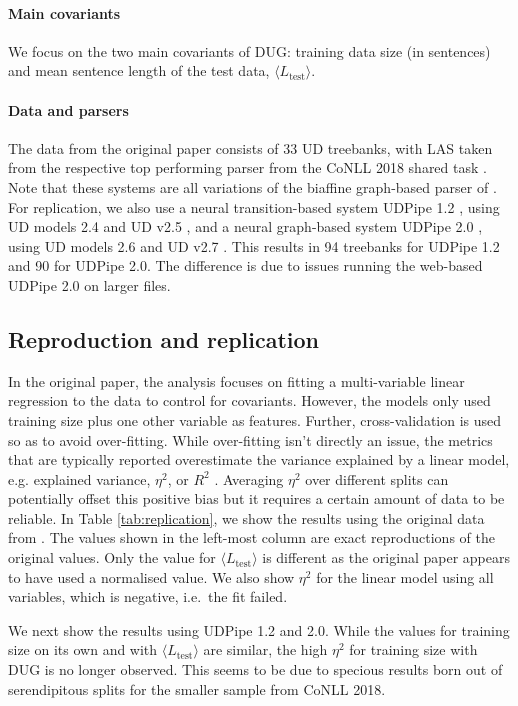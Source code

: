 \documentclass[11pt,a4paper]{article}
\newcommand{\MTL}{{$\langle L_{\textrm{test}}\rangle$}}
\begin{document}
\paragraph{Main covariants} We focus on the two main covariants of DUG: training data size (in sentences) and mean sentence length of the test data, \MTL.
\paragraph{Data and parsers} The data from the original paper consists of 33 UD treebanks, with LAS taken from the respective top performing parser from the CoNLL 2018 shared task \cite{zeman-conll18}. Note that these systems are all variations of the biaffine graph-based parser of \citet{dozat20161}. For replication, we also use a neural transition-based system UDPipe 1.2 \cite{straka2016udpipe}, using UD models 2.4 and UD v2.5 \cite{ud25}, and a neural graph-based system UDPipe 2.0 \cite{straka2018udpipe}, using UD models 2.6 and UD v2.7 \cite{ud27}. This results in 94 treebanks for UDPipe 1.2 and 90 for UDPipe 2.0. The difference is due to issues running the web-based UDPipe 2.0 on larger files.
\subsection{Reproduction and replication}
In the original paper, the analysis focuses on fitting a multi-variable linear regression to the data to control for covariants. However, the models only used training size plus one other variable as features. Further, cross-validation is used so as to avoid over-fitting. While over-fitting isn't directly an issue, the metrics that are typically reported overestimate the variance explained by a linear model, e.g. explained variance, $\eta^2$, or $R^2$ \cite{stats}. Averaging $\eta^2$ over different splits can potentially offset this positive bias but it requires a certain amount of data to be reliable. In Table \ref{tab:replication}, we show the results using the original data from \citet{sogaard-2020-languages}.  The values shown in the left-most column are exact reproductions of the original values. %
Only the value for {\MTL} is different as the original paper appears to have used a normalised value. We also show $\eta^2$ for the linear model using all variables, which is negative, i.e.\ the fit failed.

We next show the results using UDPipe 1.2 and 2.0. While the values for training size on its own and with {\MTL} are similar, the high $\eta^2$ for training size with DUG is no longer observed. This seems to be due to specious results born out of serendipitous splits for the smaller sample from CoNLL 2018. 
\end{document}

